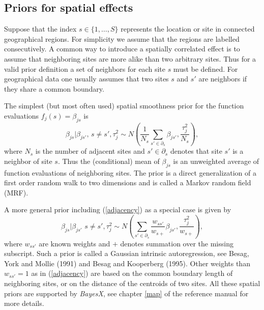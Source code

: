 \documentclass[11pt,a4paper,twoside]{bayesxarticle}
\begin{document}
\subsection{Priors for spatial effects} \label{spatial}

Suppose that the index $s \in \{ 1,\dots,S \}$ represents the
location or site in connected geographical regions. For simplicity
we assume that the regions are labelled consecutively. A common
way to introduce a spatially correlated effect is to assume that
neighboring sites are more alike than two arbitrary sites. Thus
for a valid prior definition a set of neighbors for each site $s$
must be defined. For geographical data one usually assumes that
two sites $s$ and $s'$ are neighbors if they share a common
boundary.

The simplest (but most often used) spatial smoothness prior for
the function evaluations $f_j(s)=\beta_{js}$ is
\begin{equation}
\label{adjacency} \beta_{js} | \beta_{js'}, \, {s \neq
s'},\tau_j^2 \sim N \left( \frac{1}{N_s} \sum_{s' \in \partial_s}
\beta_{js'} , \frac{\tau_j^2}{N_s} \right),
\end{equation}
where $N_s$ is the number of adjacent sites and $s' \in
\partial_s$ denotes that site $s'$ is a neighbor of site $s$. Thus
the (conditional) mean of $\beta_{js}$ is an unweighted average of
function evaluations of neighboring sites. The prior is a direct
generalization of a first order random walk to two dimensions and
is called a Markov random field (MRF).

A more general prior including (\ref{adjacency}) as a special case
is given by
\begin{equation}
\label{intrinsic} \beta_{js} | \beta_{js'} \, \, {s \neq
s'},\tau_j^2 \sim N \left( \sum_{s' \in \partial_s}
\frac{w_{ss'}}{w_{s+}} \beta_{js'}, \frac{\tau_j^2}{w_{s+}} \right),
\end{equation}
where $w_{ss'}$ are known weights and $+$ denotes summation over the
missing subscript. Such a prior is called a Gaussian intrinsic
autoregression, see Besag, York and Mollie (1991) and Besag and
Kooperberg (1995). Other weights than $w_{ss'} = 1$ as in
(\ref{adjacency}) are based on the common boundary length of
neighboring sites, or on the distance of the centroids of two sites.
All these spatial priors are supported by {\em BayesX}, see chapter
\ref*{map} of the reference manual for more details.
\end{document}
